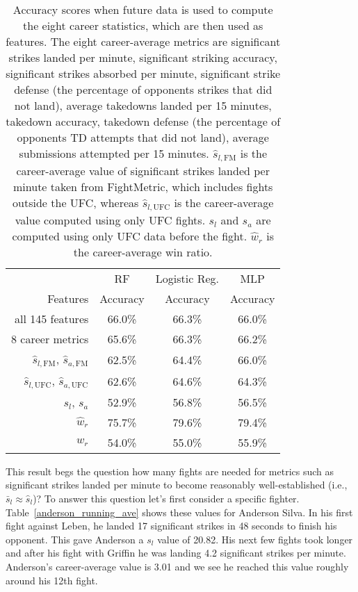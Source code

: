 \begin{center}
\begin{table}[h]
\begin{tabular}{r|ccc}
\toprule
         & RF       & Logistic Reg. & MLP     \\
Features & Accuracy & Accuracy      & Accuracy\\
\hline
all 145 features & 66.0\% & 66.3\% & 66.0\% \\
8 career metrics & 65.6\% & 66.3\% & 66.2\% \\
$\hat{s}_{l,\textrm{FM}}$, $\hat{s}_{a,\textrm{FM}}$ & 62.5\% & 64.4\% & 66.0\% \\
$\hat{s}_{l,\textrm{UFC}}$, $\hat{s}_{a,\textrm{UFC}}$ & 62.6\% & 64.6\% & 64.3\% \\
$s_l$, $s_a$ & 52.9\% & 56.8\% & 56.5\% \\
$\hat{w}_r$ & 75.7\% & 79.6\% & 79.4\% \\
$w_r$ & 54.0\% & 55.0\% & 55.9\% \\
\bottomrule
\end{tabular}
\caption{Accuracy scores when future data is used
to compute the eight career statistics, which are then
used as features.
The eight career-average metrics are
significant strikes landed per minute,
significant striking accuracy,
significant strikes absorbed per minute,
significant strike defense  (the percentage of opponents strikes that did not land),
average takedowns landed per 15 minutes,
takedown accuracy,
takedown defense (the percentage of opponents TD attempts that did not land),
average submissions attempted per 15 minutes. $\hat{s}_{l,\textrm{FM}}$ is
the career-average value of significant strikes landed per minute
taken from FightMetric, which
includes fights outside the UFC, whereas $\hat{s}_{l,\textrm{UFC}}$ is
the career-average value computed using only UFC fights.
$s_l$ and $s_a$ are computed using only UFC data before the fight. $\hat{w}_r$
is the career-average win ratio.}
\label{scores_using_career_stats}
\end{table}
\end{center}

This result begs the question how many fights are needed for metrics such
as significant strikes landed per minute
to become reasonably well-established (i.e., $\bar{s}_l \approx \hat{s}_l$)?
To answer this question let's first consider a specific fighter.
Table~\ref{anderson_running_ave} shows these values for
Anderson Silva. In his first fight against Leben, he landed
17 significant strikes in 48 seconds to finish his opponent.
This gave Anderson a $s_l$ value of 20.82. His next few fights took
longer and after his fight with Griffin he was landing
4.2 significant strikes per minute. Anderson's career-average
value is 3.01 and we see he reached this value roughly around his
12th fight.


